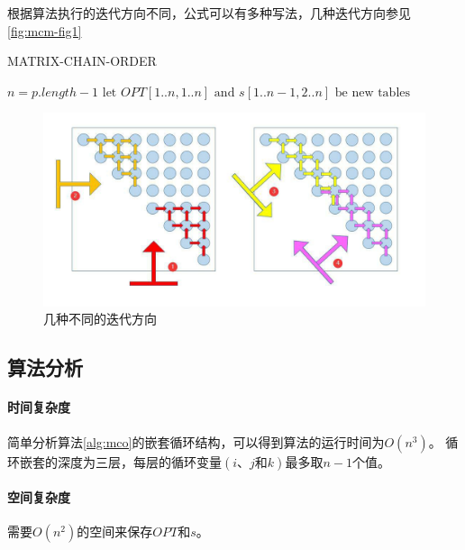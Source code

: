 \begin{remark}
  根据算法执行的迭代方向不同，公式可以有多种写法，几种迭代方向参见\autoref{fig:mcm-fig1}
\end{remark}

\begin{algorithm}
  \caption{MATRIX-CHAIN-ORDER}\label{alg:mco}
  \BlankLine{}
  $n = p.length-1$\;
  $\text{let } OPT[1..n, 1..n] \text{ and } s[1..n-1, 2..n] \text{ be new tables}$\;
\end{algorithm}

\begin{figure}[hbt!]
  \centering
  \includegraphics[scale=0.6]{image/dynamic-programming-1.png}
  \caption{几种不同的迭代方向}\label{fig:mcm-fig1}
\end{figure}

\subsection{算法分析}
\paragraph*{时间复杂度}
简单分析算法\ref{alg:mco}的嵌套循环结构，可以得到算法的运行时间为$O(n^3)$。
循环嵌套的深度为三层，每层的循环变量$(i\text{、}j\text{和}k)$最多取$n-1$个值。
\paragraph*{空间复杂度}
需要$O(n^2)$的空间来保存$OPT$和$s$。